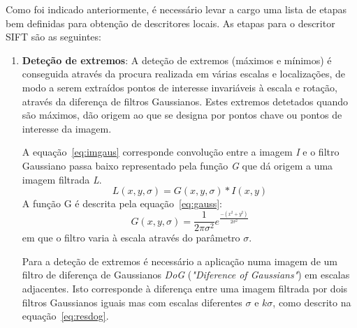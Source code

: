 Como foi indicado anteriormente, é necessário levar a cargo uma lista de etapas bem definidas para obtenção de descritores locais. As etapas para o descritor SIFT são as seguintes:

\begin{enumerate}
\item \textbf{Deteção de extremos}:  A deteção de extremos (máximos e mínimos) é conseguida através da procura realizada em várias escalas e localizações, de modo a serem extraídos pontos de interesse invariáveis à escala e rotação, através da diferença de filtros Gaussianos. Estes extremos detetados quando são máximos, dão origem ao que se designa por pontos chave ou pontos de interesse da imagem.  %

A equação~\ref{eq:imgaus} corresponde convolução entre a imagem \textit{I} e o filtro Gaussiano passa baixo representado pela função \textit{G} que dá origem a uma imagem filtrada \textit{L}.
\begin{equation}
L\left ( x, y, \sigma  \right ) = G\left ( x, y, \sigma  \right ) * I\left ( x, y \right )
\label{eq:imgaus}
\end{equation}
A função G é descrita pela equação~\ref{eq:gauss}:
\begin{equation}
G\left ( x, y, \sigma  \right ) = \frac{1}{2\pi \sigma^2} e^\frac{-\left ( x^2 + y^2 \right )}{2\sigma^2}
\label{eq:gauss} 
\end{equation}
em que o filtro varia à escala através do parâmetro $ \sigma $.

%
%

Para a deteção de extremos é necessário a aplicação numa imagem de um filtro de diferença de Gaussianos \textit{DoG} (\textit{"Diference of Gaussians"}) em escalas adjacentes. Isto corresponde à diferença entre uma imagem filtrada por dois filtros Gaussianos iguais mas com escalas diferentes $ \sigma $ e $ k\sigma$, como descrito na equação~\ref{eq:resdog}.


\end{enumerate}
